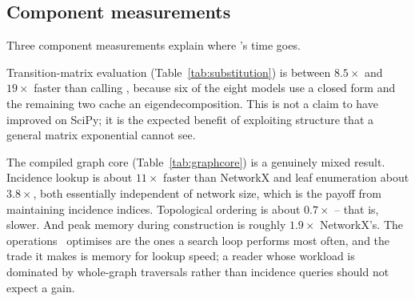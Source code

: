 \subsection{Component measurements}

\begin{table}[t]
  \centering
  \small
  
  \caption{Transition-matrix evaluation at $t = 0.1$ against a fresh
   call on the same rate matrix. Six models have a
  closed form; SYM and GTR cache an eigendecomposition. The final column is the
  largest absolute elementwise disagreement with , so this table is
  simultaneously a speed and a correctness measurement.}
  \label{tab:substitution}
\end{table}

\begin{table}[t]
  \centering
  \small
  
  \caption{The compiled graph core against 
  \cite{Hagberg2008NetworkX} on the same 1{,}999-node topology. Ratios above
  one favour \phynetpy. \phynetpy\ is faster on the incidence and leaf queries
  that dominate network search and slower on topological ordering, and it uses
  roughly twice the peak memory during construction.}
  \label{tab:graphcore}
\end{table}

\begin{table}[t]
  \centering
  \small
  
  \caption{The compiled pseudo-likelihood dynamic program against the
  pure-Python reference that remains in the repository, selected by a module
  flag so that only the inner loop differs. The final column confirms the two
  paths return the same score.}
  \label{tab:kernels}
\end{table}

Three component measurements explain where \phynetpy's time goes.

Transition-matrix evaluation (Table~\ref{tab:substitution}) is between
$8.5\times$ and $19\times$ faster than calling , because six of the
eight models use a closed form and the remaining two cache an
eigendecomposition. This is not a claim to have improved on SciPy; it is the
expected benefit of exploiting structure that a general matrix exponential
cannot see.

The compiled graph core (Table~\ref{tab:graphcore}) is a genuinely mixed
result. Incidence lookup is about $11\times$ faster than NetworkX and
leaf enumeration about $3.8\times$, both essentially independent of network
size, which is the payoff from maintaining incidence indices. Topological
ordering is about $0.7\times$ -- that is, slower. And peak memory during
construction is roughly $1.9\times$ NetworkX's. The operations \phynetpy\
optimises are the ones a search loop performs most often, and the trade it makes
is memory for lookup speed; a reader whose workload is dominated by whole-graph
traversals rather than incidence queries should not expect a gain.

